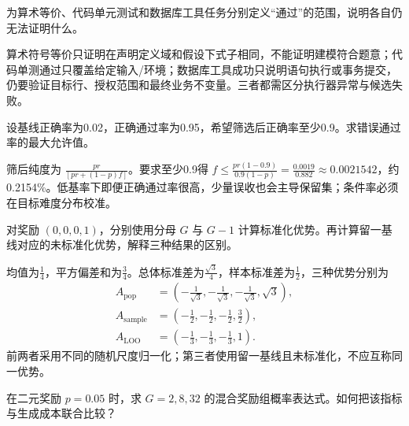 
\begin{exercises}
\begin{exercise} 为算术等价、代码单元测试和数据库工具任务分别定义“通过”的范围，说明各自仍无法证明什么。

\begin{solution}
算术符号等价只证明在声明定义域和假设下式子相同，不能证明建模符合题意；代码单测通过只覆盖给定输入/环境；数据库工具成功只说明语句执行或事务提交，仍要验证目标行、授权范围和最终业务不变量。三者都需区分执行器异常与候选失败。
\end{solution}
\end{exercise}

\begin{exercise} 设基线正确率为0.02，正确通过率为0.95，希望筛选后正确率至少0.9。求错误通过率的最大允许值。

\begin{solution}
筛后纯度为 $\frac{pr}{[pr+(1-p)f]}$。要求至少0.9得 $f\le \frac{pr(1-0.9)}{0.9(1-p)}=\frac{0.0019}{0.882}\approx0.0021542$，约0.2154\%。低基率下即便正确通过率很高，少量误收也会主导保留集；条件率必须在目标难度分布校准。
\end{solution}
\end{exercise}

\begin{exercise} 对奖励 $(0,0,0,1)$，分别使用分母 $G$ 与 $G-1$ 计算标准化优势。再计算留一基线对应的未标准化优势，解释三种结果的区别。

\begin{solution}
均值为$\frac{1}{4}$，平方偏差和为$\frac{3}{4}$。总体标准差为$\frac{\sqrt3}{4}$，样本标准差为$\frac{1}{2}$，三种优势分别为
\[
\begin{aligned}
 A_{\mathrm{pop}}&=(-\frac{1}{\sqrt3},-\frac{1}{\sqrt3},-\frac{1}{\sqrt3},\sqrt3),\\
 A_{\mathrm{sample}}&=(-\frac{1}{2},-\frac{1}{2},-\frac{1}{2},\frac{3}{2}),\\
 A_{\mathrm{LOO}}&=(-\frac{1}{3},-\frac{1}{3},-\frac{1}{3},1).
\end{aligned}
\]
前两者采用不同的随机尺度归一化；第三者使用留一基线且未标准化，不应互称同一优势。
\end{solution}
\end{exercise}

\begin{exercise} 在二元奖励 $p=0.05$ 时，求 $G=2,8,32$ 的混合奖励组概率表达式。如何把该指标与生成成本联合比较？


\end{exercise}
\end{exercises}
